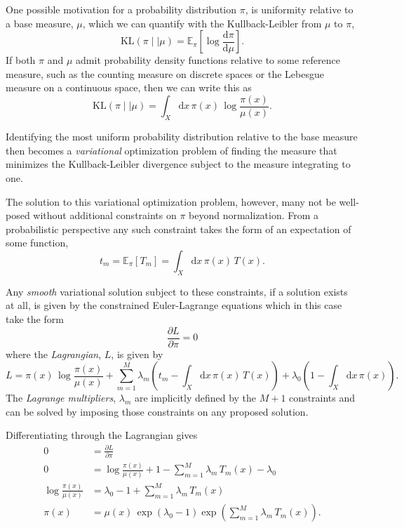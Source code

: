 \documentclass[11pt, oneside]{article}
\begin{document}
One possible motivation for a probability distribution
$\pi$, is uniformity relative to a base measure, $\mu$,
which we can quantify with the Kullback-Leibler from
$\mu$ to $\pi$,
%
\begin{equation*}
\mathrm{KL}(\pi \mid\mid \mu)
=
\mathbb{E}_{\pi} \left[ \log \frac{ \mathrm{d} \pi}{ \mathrm{d} \mu } \right].
\end{equation*}
%
If both $\pi$ and $\mu$ admit probability density 
functions relative to some reference measure, such
as the counting measure on discrete spaces or the 
Lebesgue measure on a continuous space, then we can
write this as
%
\begin{equation*}
\mathrm{KL}(\pi \mid\mid \mu)
=
\int_{X} \mathrm{d} x \, \pi(x) \, \log \frac{ \pi(x) }{ \mu(x) }.
\end{equation*}

Identifying the most uniform probability distribution 
relative to the base measure then becomes a \emph{variational}
optimization problem of finding the measure that minimizes 
the Kullback-Leibler divergence subject to the measure 
integrating to one.

The solution to this variational optimization problem, 
however, many not be well-posed without additional 
constraints on $\pi$ beyond normalization.  From a 
probabilistic perspective any such constraint takes
the form of an expectation of some function,
%
\begin{equation*}
t_{m} 
= \mathbb{E}_{\pi} [ T_{m} ]
= \int_{X} \mathrm{d} x \, \pi(x) \, T(x).
\end{equation*}

Any \emph{smooth} variational solution subject to these 
constraints, if a solution exists at all, is given by 
the constrained Euler-Lagrange equations which in this 
case take the form
%
\begin{equation*}
\frac{\partial L}{\partial \pi} = 0
\end{equation*}
%
where the \emph{Lagrangian}, $L$, is given by
%
\begin{equation*}
L = \pi(x) \, \log \frac{ \pi(x) }{ \mu(x) }
+ \sum_{m = 1}^{M} \lambda_{m} \left(t_{m} - \int_{X} \mathrm{d} x \, \pi(x) \, T(x) \right)
+ \lambda_{0} \left(1 - \int_{X} \mathrm{d} x \, \pi(x) \right).
\end{equation*}
%
The \emph{Lagrange multipliers}, $\lambda_{m}$ are implicitly
defined by the $M + 1$ constraints and can be solved by 
imposing those constraints on any proposed solution.

Differentiating through the Lagrangian gives
%
\begin{align*}
0 &=
\frac{\partial L}{\partial \pi}
\\
0 &=
\log \frac{ \pi(x) }{ \mu(x) } + 1 - \sum_{m = 1}^{M} \lambda_{m} \, T_{m}(x) - \lambda_{0}
\\
\log \frac{ \pi(x) }{ \mu(x) } 
&= \lambda_{0} - 1 + \sum_{m = 1}^{M} \lambda_{m} \, T_{m}(x)
\\
\pi(x)
&=
\mu(x) \,
\exp \left( \lambda_{0} - 1 \right)
\exp \left( \sum_{m = 1}^{M} \lambda_{m} \, T_{m}(x) \right).
\end{align*}
\end{document}
